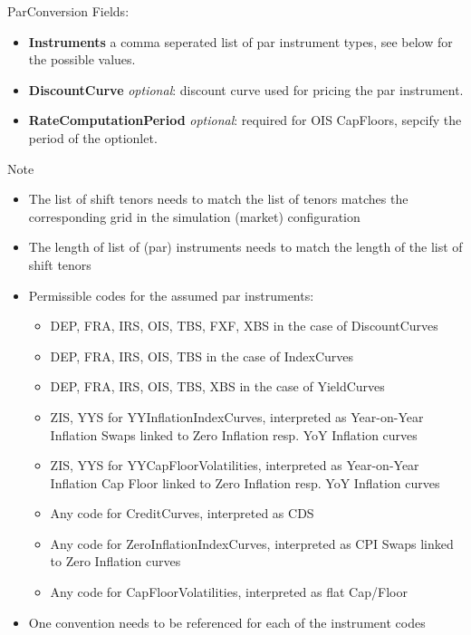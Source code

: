 ParConversion Fields:

\begin{itemize}
\item \textbf{Instruments} a comma seperated list of par instrument types, see below for the possible values.
\item \textbf{DiscountCurve} \textit{optional}: discount curve used for pricing the par instrument.
\item \textbf{RateComputationPeriod} \textit{optional}: required for OIS CapFloors, sepcify the period of the optionlet. 
\end{itemize}


Note
\begin{itemize}
\item The list of shift tenors needs to match the list of tenors matches the corresponding grid in the simulation (market) configuration
\item The length of list of (par) instruments needs to match the length of the list of shift tenors
\item Permissible codes for the assumed par instruments:
	\begin{itemize}
	\item DEP, FRA, IRS, OIS, TBS, FXF, XBS in the case of DiscountCurves 
	\item DEP, FRA, IRS, OIS, TBS in the case of IndexCurves
	\item DEP, FRA, IRS, OIS, TBS, XBS in the case of YieldCurves 
	\item ZIS, YYS for YYInflationIndexCurves, interpreted as Year-on-Year Inflation Swaps linked to Zero Inflation resp. YoY Inflation curves
	\item ZIS, YYS for YYCapFloorVolatilities, interpreted as Year-on-Year Inflation Cap Floor linked to Zero Inflation resp. YoY Inflation curves
	\item Any code for CreditCurves, interpreted as CDS
	\item Any code for ZeroInflationIndexCurves, interpreted as CPI Swaps linked to Zero Inflation curves
	\item Any code for CapFloorVolatilities, interpreted as flat Cap/Floor
	\end{itemize}
\item One convention needs to be referenced for each of the instrument codes	
\end{itemize}

